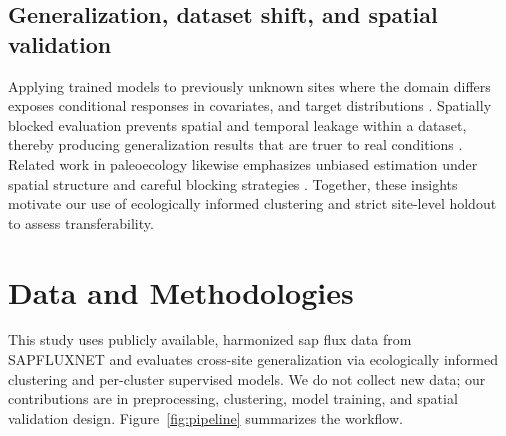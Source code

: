 \documentclass[graybox]{svmult}
\begin{document}
\subsection{Generalization, dataset shift, and spatial validation}
Applying trained models to previously unknown sites where the domain differs exposes conditional responses in covariates, and target distributions \cite{moreno-torres_unifying_2012, quinonero-candela_dataset_2009}. Spatially blocked evaluation prevents spatial and temporal leakage within a dataset, thereby producing generalization results that are truer to real conditions \cite{roberts_crossvalidation_2017}. Related work in paleoecology likewise emphasizes unbiased estimation under spatial structure and careful blocking strategies \cite{trachsel_telford_2016}. Together, these insights motivate our use of ecologically informed clustering and strict site-level holdout to assess transferability.

\section{Data and Methodologies}
\label{sec:3}
This study uses publicly available, harmonized sap flux data from SAPFLUXNET and evaluates cross-site generalization via ecologically informed clustering and per-cluster supervised models. We do not collect new data; our contributions are in preprocessing, clustering, model training, and spatial validation design. Figure~\ref{fig:pipeline} summarizes the workflow.
\end{document}
